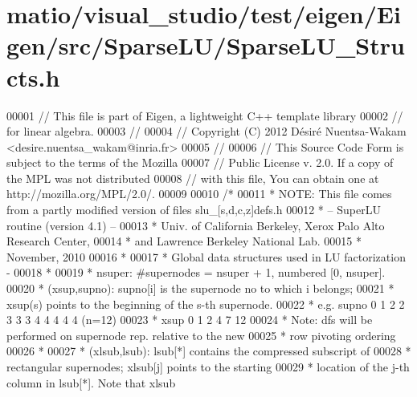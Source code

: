 \hypertarget{matio_2visual__studio_2test_2eigen_2_eigen_2src_2_sparse_l_u_2_sparse_l_u___structs_8h_source}{}\section{matio/visual\+\_\+studio/test/eigen/\+Eigen/src/\+Sparse\+L\+U/\+Sparse\+L\+U\+\_\+\+Structs.h}
\label{matio_2visual__studio_2test_2eigen_2_eigen_2src_2_sparse_l_u_2_sparse_l_u___structs_8h_source}

\begin{DoxyCode}
00001 \textcolor{comment}{// This file is part of Eigen, a lightweight C++ template library}
00002 \textcolor{comment}{// for linear algebra.}
00003 \textcolor{comment}{//}
00004 \textcolor{comment}{// Copyright (C) 2012 Désiré Nuentsa-Wakam <desire.nuentsa\_wakam@inria.fr>}
00005 \textcolor{comment}{//}
00006 \textcolor{comment}{// This Source Code Form is subject to the terms of the Mozilla}
00007 \textcolor{comment}{// Public License v. 2.0. If a copy of the MPL was not distributed}
00008 \textcolor{comment}{// with this file, You can obtain one at http://mozilla.org/MPL/2.0/.}
00009 
00010 \textcolor{comment}{/* }
00011 \textcolor{comment}{ * NOTE: This file comes from a partly modified version of files slu\_[s,d,c,z]defs.h}
00012 \textcolor{comment}{ * -- SuperLU routine (version 4.1) --}
00013 \textcolor{comment}{ * Univ. of California Berkeley, Xerox Palo Alto Research Center,}
00014 \textcolor{comment}{ * and Lawrence Berkeley National Lab.}
00015 \textcolor{comment}{ * November, 2010}
00016 \textcolor{comment}{ * }
00017 \textcolor{comment}{ * Global data structures used in LU factorization -}
00018 \textcolor{comment}{ * }
00019 \textcolor{comment}{ *   nsuper: #supernodes = nsuper + 1, numbered [0, nsuper].}
00020 \textcolor{comment}{ *   (xsup,supno): supno[i] is the supernode no to which i belongs;}
00021 \textcolor{comment}{ *  xsup(s) points to the beginning of the s-th supernode.}
00022 \textcolor{comment}{ *  e.g.   supno 0 1 2 2 3 3 3 4 4 4 4 4   (n=12)}
00023 \textcolor{comment}{ *          xsup 0 1 2 4 7 12}
00024 \textcolor{comment}{ *  Note: dfs will be performed on supernode rep. relative to the new }
00025 \textcolor{comment}{ *        row pivoting ordering}
00026 \textcolor{comment}{ *}
00027 \textcolor{comment}{ *   (xlsub,lsub): lsub[*] contains the compressed subscript of}
00028 \textcolor{comment}{ *  rectangular supernodes; xlsub[j] points to the starting}
00029 \textcolor{comment}{ *  location of the j-th column in lsub[*]. Note that xlsub }

\end{DoxyCode}
